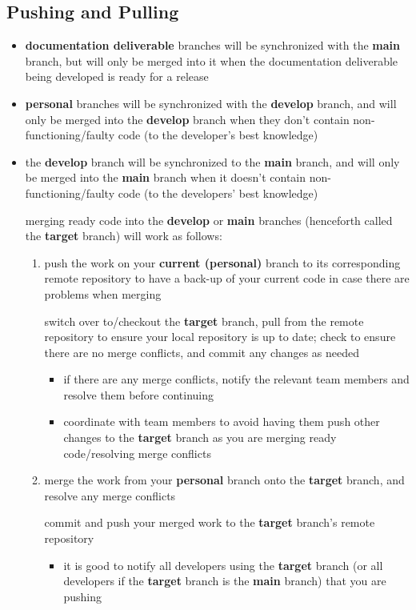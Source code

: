 \documentclass{article}
\begin{document}
\subsection{Pushing and Pulling}
\begin{itemize}
  \item \textbf{documentation deliverable} branches will be synchronized with the \textbf{main} branch, but will only be merged into it when the documentation deliverable being developed is ready for a release
  \item \textbf{personal} branches will be synchronized with the \textbf{develop} branch, and will only be merged into the \textbf{develop} branch when they don’t contain non-functioning/faulty code (to the developer’s best knowledge)
  \item the \textbf{develop} branch will be synchronized to the \textbf{main} branch, and will only be merged into the \textbf{main} branch when it doesn’t contain non-functioning/faulty code (to the developers’ best knowledge)

  \begin{item}
    merging ready code into the \textbf{develop} or \textbf{main} branches (henceforth called the \textbf{target} branch) will work as follows:
    \begin{enumerate}
      \item push the work on your \textbf{current (personal)} branch to its corresponding remote repository to have a back-up of your current code in case there are problems when merging
      \begin{item}
        switch over to/checkout the \textbf{target} branch, pull from the remote repository to ensure your local repository is up to date; check to ensure there are no merge conflicts, and commit any changes as needed
        \begin{itemize}
          \item if there are any merge conflicts, notify the relevant team members and resolve them before continuing
          \item coordinate with team members to avoid having them push other changes to the \textbf{target} branch as you are merging ready code/resolving merge conflicts
        \end{itemize}
      \end{item}
      \item merge the work from your \textbf{personal} branch onto the \textbf{target} branch, and resolve any merge conflicts
      \begin{item}
        commit and push your merged work to the \textbf{target} branch’s remote repository
        \begin{itemize}
          \item it is good to notify all developers using the \textbf{target} branch (or all developers if the \textbf{target} branch is the \textbf{main} branch) that you are pushing
        \end{itemize}
      \end{item}
    \end{enumerate}
  \end{item}


\end{itemize}
\end{document}
